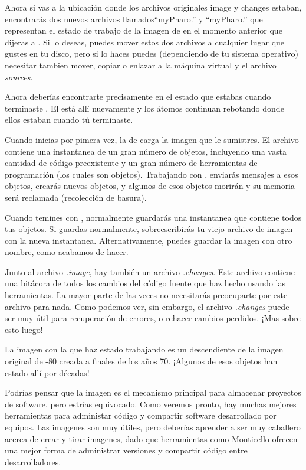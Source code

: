 \documentclass[a4paper,10pt,twoside]{book}
\begin{document}
Ahora si vas a la ubicaci\'on donde los archivos originales image y changes estaban, encontrar\'as dos nuevos archivos llamados``myPharo.'' y ``myPharo.'' que representan el estado de trabajo de la imagen de \pharo en el momento anterior que dijeras a \pharo {}.
Si lo deseas, puedes mover estos dos archivos a cualquier lugar que gustes en tu disco, pero si lo haces puedes (dependiendo de tu sistema operativo) necesitar tambien mover, copiar o enlazar a la m\'aquina virtual y el archivo \emph{sources}.


Ahora deber\'ias encontrarte precisamente en el estado que estabas cuando terminaste \pharo. El \bam est\'a all\'i nuevamente y los \'atomos continuan rebotando donde ellos estaban cuando t\'u terminaste.

Cuando inicias \pharo por pimera vez, la  de \pharo carga la imagen que le sumistres. El archivo contiene una instantanea de un gran n\'umero de objetos, incluyendo una vasta cantidad de c\'odigo preexistente y un gran n\'umero de herramientas de programaci\'on (los cuales son objetos). Trabajando con \pharo, enviar\'as mensajes a esos objetos, crear\'as nuevos objetos, y algunos de esos objetos morir\'an y su memoria ser\'a reclamada (\ie recolecci\'on de basura).

Cuando temines con \pharo, normalmente guardar\'as una instantanea que contiene todos tus objetos. Si guardas normalmente, sobreescribir\'as tu viejo archivo de imagen con la nueva instantanea. Alternativamente, puedes guardar la imagen con otro nombre, como acabamos de hacer.

Junto al archivo \emph{.image}, hay tambi\'en un archivo \emph{.changes}.
Este archivo contiene una bit\'acora de todos los cambios del c\'odigo fuente que haz hecho usando las herramientas.
La mayor parte de las veces no necesitar\'as preocuparte por este archivo para nada.
Como podemos ver, sin embargo, el archivo \emph{.changes} puede ser muy \'util para recuperaci\'on de errores, o rehacer cambios perdidos.
¡Mas sobre esto luego!

La imagen con la que haz estado trabajando es un descendiente de la imagen original de \st-80 creada a finales de los años 70.
¡Algunos de esos objetos han estado all\'i por d\'ecadas!

Podr\'ias pensar que la imagen es el mecanismo principal para almacenar proyectos de software, pero estr\'ias equivocado.
Como veremos pronto, hay muchas mejores herramientas para administar c\'odigo y compartir software desarrollado por equipos.
Las imagenes son muy \'utiles, pero deber\'ias aprender a ser muy caballero acerca de crear y tirar imagenes, dado que herramientas como Monticello ofrecen una mejor forma de administrar versiones y compartir c\'odigo entre desarrolladores.
\end{document}
